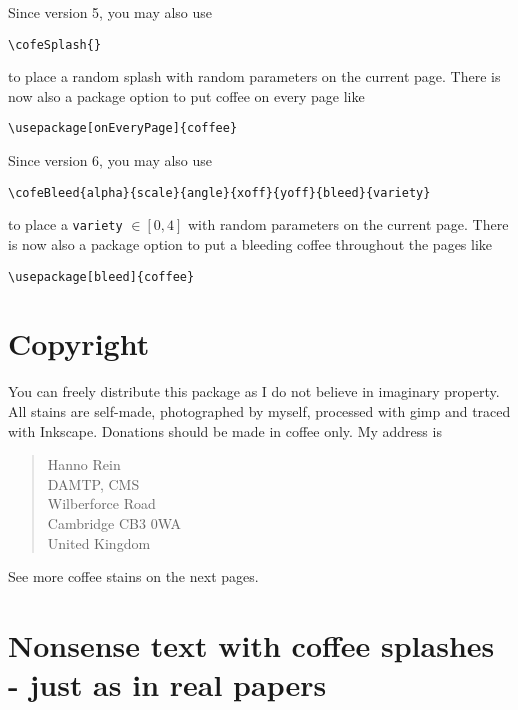 \documentclass{article}
\begin{document}
\medskip
Since version 5, you may also use
\begin{verbatim}
\cofeSplash{}
\end{verbatim}
to place a random splash with random parameters on the current
page. There is now also a package option to put coffee on every page like
\begin{verbatim}
\usepackage[onEveryPage]{coffee}
\end{verbatim}

\medskip
Since version 6, you may also use
\begin{verbatim}
\cofeBleed{alpha}{scale}{angle}{xoff}{yoff}{bleed}{variety}
\end{verbatim}
to place a \texttt{variety} $\in [0,4]$ with random parameters on the current
page. There is now also a package option to put a bleeding coffee throughout the pages like
\begin{verbatim}
\usepackage[bleed]{coffee}
\end{verbatim}


\section{Copyright}
You can freely distribute this package as I do not believe in imaginary property. All stains are self-made, photographed by myself, processed with gimp and traced with Inkscape.
Donations should be made in coffee only. My address is
\begin{quote}
Hanno Rein\\
DAMTP, CMS\\
Wilberforce Road\\
Cambridge CB3 0WA\\
United Kingdom
\end{quote}
See more coffee stains on the next pages.
\newpage
\section{Nonsense text with coffee splashes - just as in real papers}
\lipsum[1-42]
\end{document}
